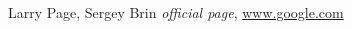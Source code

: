 \begin{thebibliography}{99999}
\singlespace\normalsize

 Larry Page, Sergey Brin \textit{ official page}, \url{www.google.com}





\end{thebibliography}
